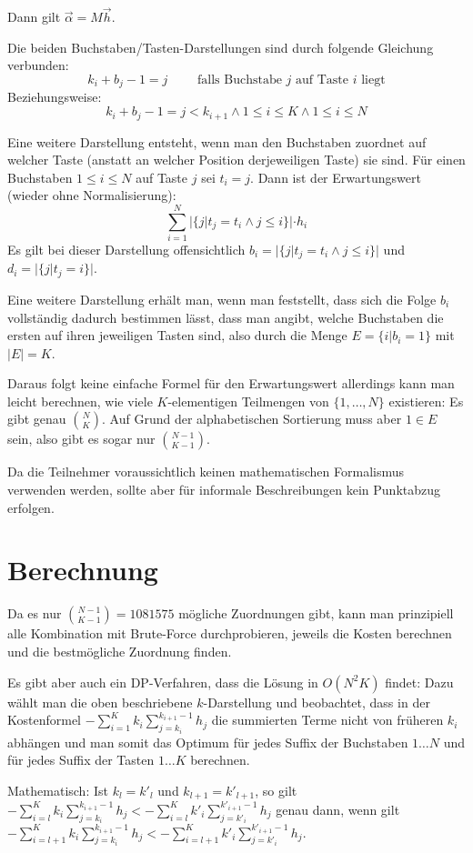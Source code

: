\documentclass[11pt,a4paper]{article}
\begin{document}
Dann gilt $\vec{\alpha}=M\vec{h}$.


Die beiden Buchstaben/Tasten-Darstellungen sind durch folgende Gleichung verbunden:
\[k_i + b_j - 1 = j \qquad \text{ falls Buchstabe $j$ auf Taste $i$ liegt}\]
Beziehungsweise:
\[k_i + b_j - 1 = j < k_{i+1} \wedge 1 \leq i \leq K \wedge 1 \leq i \leq N\]


Eine weitere Darstellung entsteht, wenn man den Buchstaben zuordnet auf welcher Taste (anstatt an welcher Position derjeweiligen Taste) sie sind. Für einen Buchstaben $1 \leq i \leq N$ auf Taste $j$ sei $t_i = j$. Dann ist der Erwartungswert (wieder ohne Normalisierung):
\[\sum\limits_{i=1}^{N}|\{j | t_j = t_i \wedge j\leq i\}|\cdot h_i\]
Es gilt bei dieser Darstellung offensichtlich $b_i = |\{j | t_j = t_i \wedge j\leq i\}|$ und $d_i = |\{j|t_j=i\}|$.

Eine weitere Darstellung erhält man, wenn man feststellt, dass sich die Folge $b_i$ vollständig dadurch bestimmen lässt, dass man angibt, welche Buchstaben die ersten auf ihren jeweiligen Tasten sind, also durch die Menge $E=\{i|b_i=1\}$ mit $|E| = K$. 

Daraus folgt keine einfache Formel für den Erwartungswert allerdings kann man leicht berechnen, wie viele $K$-elementigen Teilmengen von $\{1,\ldots,N\}$ existieren: Es gibt genau $\binom{N}{K}$.
Auf Grund der alphabetischen Sortierung muss aber $1 \in E$ sein, also gibt es sogar nur $\binom{N-1}{K-1}$.

Da die Teilnehmer voraussichtlich keinen mathematischen Formalismus verwenden werden, sollte aber für informale Beschreibungen kein Punktabzug erfolgen.

\section{Berechnung}
Da es nur $\binom{N-1}{K-1} = 1 081 575$ mögliche Zuordnungen gibt, kann man prinzipiell alle Kombination mit Brute-Force durchprobieren, jeweils die Kosten berechnen und die bestmögliche Zuordnung finden.


Es gibt aber auch ein DP-Verfahren, dass die Lösung in $O(N^2K)$ findet:
Dazu wählt man die oben beschriebene $k$-Darstellung und beobachtet, dass in der Kostenformel $- \sum\limits_{i=1}^{K}k_i\sum\limits_{j=k_i}^{k_{i+1}-1} h_j$ die summierten Terme nicht von früheren $k_i$ abhängen und man somit das Optimum für jedes Suffix der Buchstaben $1\ldots N$ und für jedes Suffix der Tasten $1\ldots K$ berechnen. 

Mathematisch: Ist $k_l = k'_l$ und $k_{l+1}=k'_{l+1}$, so gilt $- \sum\limits_{i=l}^{K}k_i\sum\limits_{j=k_i}^{k_{i+1}-1} h_j < - \sum\limits_{i=l}^{K}k'_i\sum\limits_{j=k'_i}^{k'_{i+1}-1} h_j$ genau dann, wenn gilt $- \sum\limits_{i=l+1}^{K}k_i\sum\limits_{j=k_i}^{k_{i+1}-1} h_j < - \sum\limits_{i=l+1}^{K}k'_i\sum\limits_{j=k'_i}^{k'_{i+1}-1} h_j$.
\end{document}
